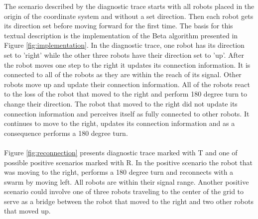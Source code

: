 The scenario described by the diagnostic trace starts with all robots placed in the origin of the coordinate system and without a set direction. Then each robot gets its direction set before moving forward for the first time. The basis for this textual description is the implementation of the Beta algorithm presented in Figure \ref{fig:implementation}. In the diagnostic trace, one robot has its direction set to 'right' while the other three robots have their direction set to 'up'. After the robot moves one step to the right it updates its connection information. It is connected to all of the robots as they are within the reach of its signal. Other robots move up and update their connection information. All of the robots react to the loss of the robot that moved to the right and perform 180 degree turn to change their direction. The robot that moved to the right did not update its connection information and perceives itself as fully connected to other robots. It continues to move to the right, updates its connection information and as a consequence performs a 180 degree turn.\\
\\
\noindent
Figure \ref{fig:reconnection} presents diagnostic trace marked with T and one of possible positive scenarios marked with R. In the positive scenario the robot that was moving to the right, performs a 180 degree turn and reconnects with a swarm by moving left. All robots are within their signal range. Another positive scenario could involve one of three robots traveling to the center of the grid to serve as a bridge between the robot that moved to the right and two other robots that moved up.

